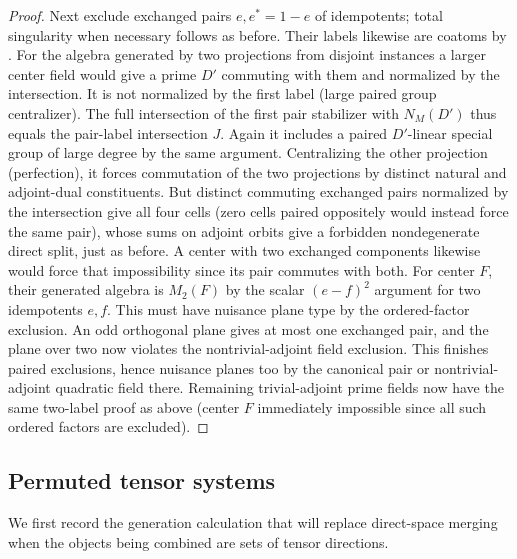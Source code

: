 \begin{proof}
Next exclude exchanged pairs \(e,e^*=1-e\) of idempotents; total singularity when necessary follows as before. Their labels likewise are coatoms by . For the algebra generated by two projections from disjoint instances a larger center field would give a prime \(D'\) commuting with them and normalized by the intersection. It is not normalized by the first label (large paired group centralizer). The full intersection of the first pair stabilizer with \(N_M(D')\) thus equals the pair-label intersection \(J\). Again it includes a paired \(D'\)-linear special group of large degree by the same argument. Centralizing the other projection (perfection), it forces commutation of the two projections by distinct natural and adjoint-dual constituents. But distinct commuting exchanged pairs normalized by the intersection give all four cells (zero cells paired oppositely would instead force the same pair), whose sums on adjoint orbits give a forbidden nondegenerate direct split, just as before. A center with two exchanged components likewise would force that impossibility since its pair commutes with both. For center \(F\), their generated algebra is \(M_2(F)\) by the scalar \((e-f)^2\) argument for two idempotents \(e,f\). This must have nuisance plane type by the ordered-factor exclusion. An odd orthogonal plane gives at most one exchanged pair, and the plane over two now violates the nontrivial-adjoint field exclusion. This finishes paired exclusions, hence nuisance planes too by the canonical pair or nontrivial-adjoint quadratic field there. Remaining trivial-adjoint prime fields now have the same two-label proof as above (center \(F\) immediately impossible since all such ordered factors are excluded).

\end{proof}

\subsection{Permuted tensor systems}
We first record the generation calculation that will replace direct-space
merging when the objects being combined are sets of tensor directions.

